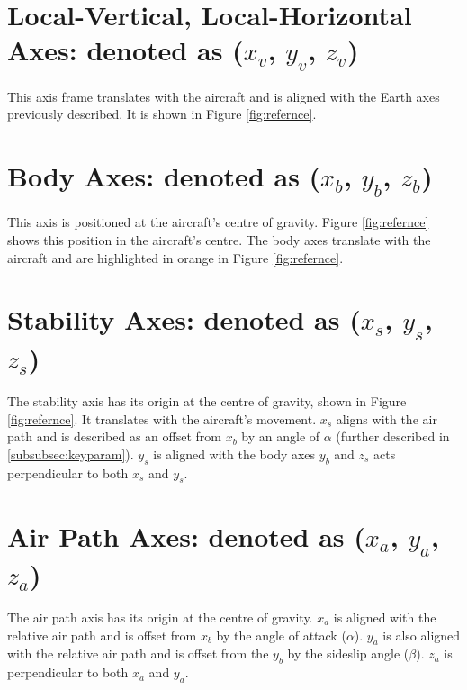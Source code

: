 \section{Local-Vertical, Local-Horizontal Axes: denoted as ($x_v$, $y_v$, $z_v$)}
 This axis frame translates with the aircraft and is aligned with the Earth axes previously described. It is shown in Figure \ref{fig:refernce}.

\section{Body Axes: denoted as ($x_b$, $y_b$, $z_b$)} 
This axis is positioned at the aircraft's centre of gravity. Figure \ref{fig:refernce} shows this position in the aircraft's centre. The body axes translate with the aircraft and are highlighted in orange in Figure \ref{fig:refernce}.

\section{Stability Axes: denoted as ($x_s$, $y_s$, $z_s$)} 
The stability axis has its origin at the centre of gravity, shown in Figure \ref{fig:refernce}. It translates with the aircraft's movement. $x_s$ aligns with the air path and is described as an offset from $x_b$ by an angle of $\alpha$ (further described in \ref{subsubsec:keyparam}). $y_s$ is aligned with the body axes $y_b$ and $z_s$ acts perpendicular to both $x_s$ and $y_s$.


\section{Air Path Axes: denoted as ($x_a$, $y_a$, $z_a$)}
The air path axis has its origin at the centre of gravity. $x_a$ is aligned with the relative air path and is offset from $x_b$ by the angle of attack ($\alpha$). $y_a$ is also aligned with the relative air path and is offset from the $y_b$ by the sideslip angle ($\beta$). $z_a$ is perpendicular to both $x_a$ and $y_a$. 

